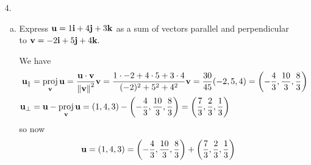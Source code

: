 \documentclass{article}
\newcommand{\vu}{{\bf u}}
\newcommand{\vv}{{\bf v}}
\newcommand{\vi}{{\bf i}}
\newcommand{\vj}{{\bf j}}
\newcommand{\vk}{{\bf k}}
\DeclareMathOperator{\proj}{proj}
\begin{document}
\begin{itemize}
\begin{enumerate}[(a)]
\begin{proof}
					Alternatively, we can use the identities
					\begin{align*}
						\left\lVert \vu\times\vv \right\rVert &= \left\lVert \vu \right\rVert\left\lVert \vv \right\rVert\sin \theta \\
						\vu\cdot\vv &= \left\lVert \vu \right\rVert\left\lVert \vv \right\rVert\cos \theta \\
						\implies \left\lVert \vu\times\vv \right\rVert^2 + (\vu\cdot\vv)^2 &= \left\lVert \vu \right\rVert^2\left\lVert \vv \right\rVert^2\sin^2\theta + \left\lVert \vu \right\rVert^2\left\lVert \vv \right\rVert^2\cos^2\theta \\
						&= \left\lVert \vu \right\rVert^2\left\lVert \vv \right\rVert^2\left( \sin^2\theta+\cos^2\theta \right) = \left\lVert \vu \right\rVert^2\left\lVert \vv \right\rVert^2	 \\
						\implies \left\lVert \vu\times\vv \right\rVert^2 &= \left\lVert \vu \right\rVert^2\left\lVert \vv \right\rVert^2 + (\vu\cdot\vv)^2
					\end{align*}
					This also proves that this equality generalizes to any dimension, not just $\RR^3!$
				\end{proof}

		\end{enumerate}

	\item[4.]
		\begin{enumerate}[(a)]
			\item Express $\vu = 1\vi + 4\vj + 3\vk$ as a sum of vectors parallel and perpendicular to $\vv=-2\vi + 5\vj + 4\vk.$
				\begin{soln}
					We have
					\begin{align*}
						\vu_{\parallel} &= \proj_{\vv}\vu = \frac{\vu\cdot\vv}{\left\lVert \vv \right\rVert^2}\vv = \frac{1\cdot -2 + 4\cdot 5 + 3\cdot 4}{(-2)^2+5^2+4^2}\vv = \frac{30}{45}(-2, 5, 4) = \left( -\frac{4}{3}, \frac{10}{3}, \frac{8}{3} \right) \\
						\vu_{\bot} &= \vu - \proj_{\vv}\vu = (1, 4, 3) - \left( -\frac{4}{3}, \frac{10}{3}, \frac{8}{3} \right) = \left( \frac{7}{3}, \frac{2}{3}, \frac{1}{3} \right)
					\end{align*}
					so now
					\begin{align*}
						\vu = (1, 4, 3) = \left( -\frac{4}{3}, \frac{10}{3}, \frac{8}{3} \right) + \left( \frac{7}{3}, \frac{2}{3}, \frac{1}{3} \right)
					\end{align*}
				\end{soln}


\end{enumerate}
\end{itemize}
\end{document}
